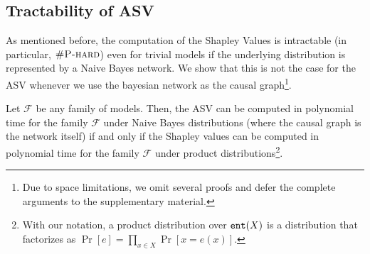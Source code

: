 \subsection{Tractability of ASV}

As mentioned before, the computation of the Shapley Values is intractable (in particular, $\textsc{\#P-hard}$) even for trivial models
if the underlying distribution is represented by a Naive Bayes network. We show that this is not the case for the ASV whenever we use the bayesian network as the causal graph\footnote{Due to space limitations, we omit several proofs and defer the complete arguments to the supplementary material.}.

\begin{theorem}\label{the:asv_naive_bayes_tractable_clean}
	Let $\mathcal{F}$ be any family of models. Then, the ASV can be computed in polynomial time for the family $\mathcal{F}$ under Naive Bayes distributions (where the causal graph is the network itself) if and only if the Shapley values can be computed in polynomial time for the family $\mathcal{F}$ under product distributions\footnote{With our notation, a product distribution over $\texttt{ent}{}(X)$ is a distribution that factorizes as $\Pr\left[e\right] = \prod_{x \in X}\Pr\left[ x = e(x) \right]$.}.
\end{theorem}

